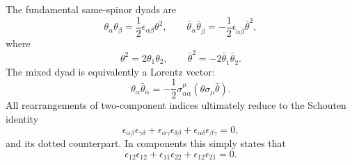 The fundamental same-spinor dyads are
\begin{equation}
  \theta_\alpha\theta_\beta
  =\frac12\epsilon_{\alpha\beta}\theta^2,
  \qquad
  \bar\theta_{\dot\alpha}\bar\theta_{\dot\beta}
  =-\frac12\epsilon_{\dot\alpha\dot\beta}\bar\theta^2,
  \tag{26.A.9}\label{eq:26.A.9}
\end{equation}
where
\[
  \theta^2=2\theta_1\theta_2,
  \qquad
  \bar\theta^2=-2\bar\theta_{\dot1}\bar\theta_{\dot2}.
\]
The mixed dyad is equivalently a Lorentz vector:
\begin{equation}
  \theta_\alpha\bar\theta_{\dot\alpha}
  =-\frac12\sigma^\mu_{\alpha\dot\alpha}
    (\theta\sigma_\mu\bar\theta).
  \tag{26.A.10}\label{eq:26.A.10}
\end{equation}
All rearrangements of two-component indices ultimately reduce to the
Schouten identity
\begin{equation}
  \epsilon_{\alpha\beta}\epsilon_{\gamma\delta}
  +\epsilon_{\alpha\gamma}\epsilon_{\delta\beta}
  +\epsilon_{\alpha\delta}\epsilon_{\beta\gamma}=0,
  \tag{26.A.11}\label{eq:26.A.11}
\end{equation}
and its dotted counterpart. In components this simply states that
\[
  \epsilon_{12}\epsilon_{12}
  +\epsilon_{11}\epsilon_{22}
  +\epsilon_{12}\epsilon_{21}=0 .
\]

